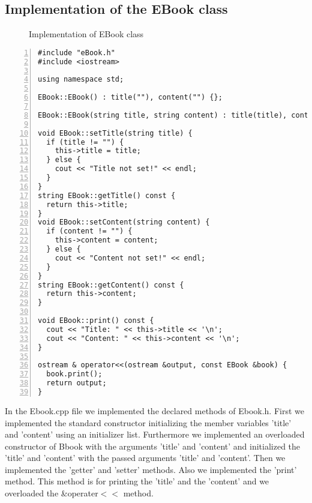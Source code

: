 \documentclass{article}
\begin{document}
\subsection{Implementation of the EBook class}
\begin{figure}
  \scriptsize{\caption{Implementation of EBook class}}
\end{figure}
\begin{lstlisting}[basicstyle=\footnotesize\ttfamily, numbers=left, stepnumber=1, numberstyle = \normalsize]
#include "eBook.h"
#include <iostream>

using namespace std;

EBook::EBook() : title(""), content("") {};

EBook::EBook(string title, string content) : title(title), content(content) {};

void EBook::setTitle(string title) {
  if (title != "") {
    this->title = title;
  } else {
    cout << "Title not set!" << endl;
  }
}
string EBook::getTitle() const {
  return this->title;
}
void EBook::setContent(string content) {
  if (content != "") {
    this->content = content;
  } else {
    cout << "Content not set!" << endl;
  }
}
string EBook::getContent() const {
  return this->content;
}

void EBook::print() const {
  cout << "Title: " << this->title << '\n';
  cout << "Content: " << this->content << '\n';
}

ostream & operator<<(ostream &output, const EBook &book) {
  book.print();
  return output;
}
\end{lstlisting}
\normalsize{In the Ebook.cpp file we implemented the declared methods of Ebook.h.
  First we implemented the standard constructor initializing the member variables 'title' and 'content' using an initializer list.
  Furthermore we implemented an overloaded constructor of Bbook with the arguments 'title' and 'content' and initialized the 'title' and 'content' with the passed arguments 'title' and 'content'.
  Then we implemented the 'getter' and 'setter' methods.
Also we implemented the 'print' method. This method is for printing the 'title' and the 'content' and we overloaded the \&operater$<<$ method.}




\end{document}
